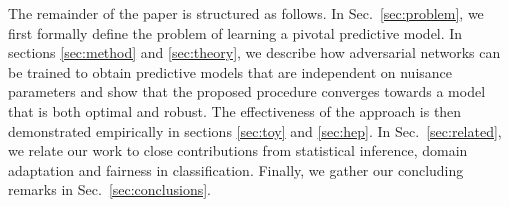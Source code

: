 \documentclass[twocolumn,superscriptaddress,aps]{revtex4-1}
\theoremstyle{plain}
\begin{document}
The remainder of the paper is structured as follows. In Sec.~\ref{sec:problem},
we first formally define the problem of learning a pivotal predictive model. In
sections \ref{sec:method} and \ref{sec:theory}, we describe how adversarial
networks can be trained to obtain predictive models that are independent on
nuisance parameters and show that the proposed procedure converges
towards a model that is both optimal and robust. The  effectiveness of the
approach is then demonstrated empirically in sections \ref{sec:toy} and \ref{sec:hep}.
In Sec.~\ref{sec:related}, we relate our work to
close contributions from statistical inference, domain adaptation and fairness
in classification. Finally, we gather our concluding remarks in
Sec.~\ref{sec:conclusions}.


\end{document}
